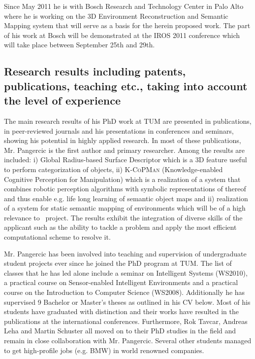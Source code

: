 Since May 2011 he is with Bosch Research and Technology Center in Palo Alto where he is working 
on the 3D Environment Reconstruction and Semantic Mapping system that will serve as a basis for
the herein proposed work. The part of his work at Bosch will be demonstrated at the IROS 2011
conference which will take place between September 25th and 29th. \\ 
\subsection{Research results including patents, publications, teaching etc., taking into account the level 
of experience} 
The main research results of his PhD work at TUM are presented in publications, in
peer-reviewed journals and his presentations in conferences and seminars, showing his 
potential in highly applied research. In most of these publications, Mr. Pangercic is the  first 
author and primary researcher. Among the results are included: i) Global Radius-based Surface
Descriptor which is a 3D feature useful to perform categorization of objects, ii) \textsc{K-CoPMan}
(Knowledge-enabled Cognitive Perception for Manipulation) which is a realization of a system that 
combines robotic perception algorithms with symbolic representations of thereof and thus enable
e.g. life long learning of semantic object maps and ii) realization of
a system for static semantic mapping of environments which will be of a high relevance to \ksem\ project.
The results exhibit the integration of diverse skills of the applicant such as the ability  to tackle 
a problem and apply the most efficient computational scheme to resolve it.

Mr. Pangercic has been involved into teaching and supervision of undergraduate 
student projects ever since he joined the PhD program at TUM. The list of classes 
that he has led alone include a seminar on Intelligent Systems (WS2010), a practical 
course on Sensor-enabled Intelligent Environments and a practical course on the 
Introduction to Computer Science (WS2008). Additionally he has supervised 9 Bachelor
or Master's theses as outlined in his CV below. Most of his students have graduated
with distinction and their works have resulted in the publications at the international
conferences. Furthermore, Rok Tavcar, Andreas Leha and Martin Schuster all moved on 
to their PhD studies in the field and remain in close collaboration with Mr. Pangercic.
Several other students managed to get high-profile jobs (e.g. BMW) in world renowned 
companies. 

